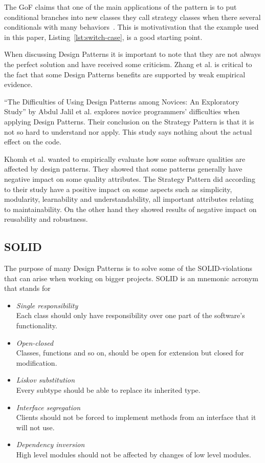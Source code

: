 \documentclass[conference, a4paper]{IEEEtran}
\begin{document}
The GoF claims that one of the main applications of the pattern is to put conditional branches into new classes they call strategy classes when there several conditionals with many behaviors~\cite{bibitem:GoF}. This is motivativation that the example used in this paper, Listing~\ref{lst:switch-case}, is a good starting point.

When discussing Design Patterns it is important to note that they are not always the perfect solution and have received some criticism. Zhang et al. is critical to the fact that some Design Patterns benefits are supported by weak empirical evidence.~\cite{bibitem:Zhang}

``The Difficulties of Using Design Patterns among Novices: An Exploratory Study'' by Abdul Jalil et al. explores novice programmers' difficulties when applying Design Patterns. Their conclusion on the Strategy Pattern is that it is not so hard to understand nor apply. This study says nothing about the actual effect on the code.~\cite{bibitem:Jalil}

Khomh et al. wanted to empirically evaluate how some software qualities are affected by design patterns. They showed that some patterns generally  have negative impact on some quality attributes. The Strategy Pattern did according to their study have a positive impact on some aspects such as simplicity, modularity, learnability and understandability, all important attributes relating to maintainability. On the other hand they showed results of negative impact on reusability and robustness.~\cite{bibitem:DPaSQ}

\subsection{SOLID}
The purpose of many Design Patterns is to solve some of the SOLID-violations that can arise when working on bigger projects. SOLID is an mnemonic acronym that stands for
\begin{itemize}
    \item \emph{Single responsibility} \\
    Each class should only have responsibility over one part of the software's functionality.
    \item \emph{Open-closed} \\
    Classes, functions and so on, should be open for extension but closed for modification.
    \item \emph{Liskov substitution} \\
    Every subtype should be able to replace its inherited type.
    \item \emph{Interface segregation} \\
    Clients should not be forced to implement methods from an interface that it will not use.
    \item \emph{Dependency inversion} \\
    High level modules should not be affected by changes of low level modules.
\end{itemize}
\end{document}
